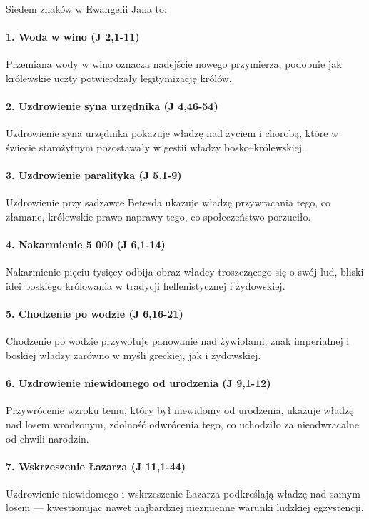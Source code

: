 Siedem znaków w Ewangelii Jana to:

\paragraph{1. Woda w wino (J 2,1-11)} Przemiana wody w wino oznacza nadejście nowego przymierza, podobnie jak królewskie uczty potwierdzały legitymizację królów.

\paragraph{2. Uzdrowienie syna urzędnika (J 4,46-54)} Uzdrowienie syna urzędnika pokazuje władzę nad życiem i chorobą, które w świecie starożytnym pozostawały w gestii władzy bosko–królewskiej.

\paragraph{3. Uzdrowienie paralityka (J 5,1-9)} Uzdrowienie przy sadzawce Betesda ukazuje władzę przywracania tego, co złamane, królewskie prawo naprawy tego, co społeczeństwo porzuciło.

\paragraph{4. Nakarmienie 5 000 (J 6,1-14)} Nakarmienie pięciu tysięcy odbija obraz władcy troszczącego się o swój lud, bliski idei boskiego królowania w tradycji hellenistycznej i żydowskiej.

\paragraph{5. Chodzenie po wodzie (J 6,16-21)} Chodzenie po wodzie przywołuje panowanie nad żywiołami, znak imperialnej i boskiej władzy zarówno w myśli greckiej, jak i żydowskiej.

\paragraph{6. Uzdrowienie niewidomego od urodzenia (J 9,1-12)} Przywrócenie wzroku temu, który był niewidomy od urodzenia, ukazuje władzę nad losem wrodzonym, zdolność odwrócenia tego, co uchodziło za nieodwracalne od chwili narodzin.

\paragraph{7. Wskrzeszenie Łazarza (J 11,1-44)} Uzdrowienie niewidomego i wskrzeszenie Łazarza podkreślają władzę nad samym losem --- kwestionując nawet najbardziej niezmienne warunki ludzkiej egzystencji.

